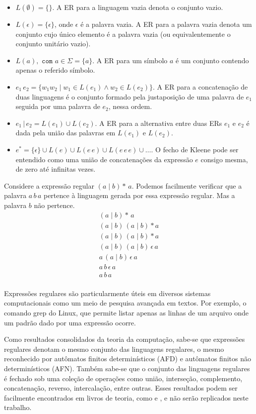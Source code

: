  \begin{itemize}
   \item $L(\emptyset) = \{\}$. A ER para a linguagem vazia denota o conjunto vazio.
   \item $L(\epsilon) = \{\epsilon\}$, onde $\epsilon$ é a palavra vazia. A ER para a palavra vazia denota um conjunto cujo único elemento é a palavra vazia (ou equivalentemente o conjunto unitário vazio).
   \item $L(a), \texttt{ com } a \in \Sigma = \{a\}$. A ER para um símbolo $a$ é um conjunto contendo apenas o referido símbolo.
   \item $e_1\,e_2 = \{w_1w_2 \mid w_1 \in L(e_1) \wedge w_2 \in L(e_2)\}$. A ER para a concatenação de duas linguagens é o conjunto formado pela justaposição de uma palavra de $e_1$ seguida por uma palavra de $e_2$, nessa ordem.
   \item $e_1\,|\,e_2 = L(e_1) \cup L(e_2)$. A ER para a alternativa entre duas ERs $e_1$ e $e_2$ é dada pela união das palavras em $L(e_1)$ e $L(e_2)$.
   \item $e^* = \{\epsilon\} \cup L(e) \cup L(e\,e) \cup L(e\,e\,e) \cup \ldots$. O fecho de Kleene pode ser entendido como uma união de concatenações da expressão $e$ consigo mesma, de zero até infinitas vezes.
 \end{itemize}

 Considere a expressão regular $(a\;|\;b)*\,a$. Podemos facilmente verificar que a palavra $a\,b\,a$ pertence à linguagem gerada por essa expressão regular. Mas a palavra $b$ não pertence.
 \[
   \begin{array}{l}
       (a\;|\;b)*\,a \\
       (a\;|\;b)\,(a\;|\;b)*a\\
       (a\;|\;b)\,(a\;|\;b)*a\\
       (a\;|\;b)\,(a\;|\;b)\,\epsilon\, a\\
       a\,(a\;|\;b)\,\epsilon\, a\\
       a\,b\,\epsilon\, a\\
       a\,b\,a\\
   \end{array}
 \]

 Expressões regulares são particularmente úteis em diversos sistemas computacionais como um meio de pesquisa avançada em textos. Por exemplo, o comando grep \cite{linux_grep_man} do Linux, que permite listar apenas as linhas de um arquivo onde um padrão dado por uma expressão ocorre.

 Como resultados consolidados da teoria da computação, sabe-se que expressões regulares denotam o mesmo conjunto das linguagens regulares, o mesmo reconhecido por autômatos finitos determinísticos (AFD) e autômatos finitos não determinísticos (AFN). Também sabe-se que o conjunto das linguagens regulares é fechado sob uma coleção de operações como união, interseção, complemento, concatenação, reverso, intercalação, entre outras. Esses resultados podem ser facilmente encontrados em livros de teoria, como \cite{vieira2006} e \cite{hopcroft2006}, e não serão replicados neste trabalho.


